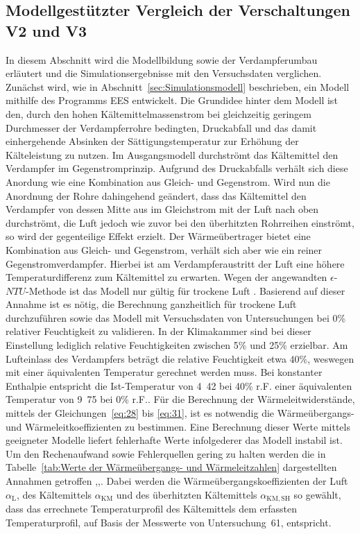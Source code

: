\clearpage

\subsection{Modellgestützter Vergleich der Verschaltungen V2 und V3}
\label{subsec:Modellgestützter Vergleich der Verschaltungen V2 und V3}

In diesem Abschnitt wird die Modellbildung sowie der Verdampferumbau erläutert und die Simulationsergebnisse mit den Versuchsdaten verglichen.
Zunächst wird, wie in Abschnitt~\ref{sec:Simulationsmodell} beschrieben, ein Modell mithilfe des Programms EES entwickelt. 
Die Grundidee hinter dem Modell ist den, durch den hohen Kältemittelmassenstrom bei gleichzeitig geringem Durchmesser der Verdampferrohre bedingten, Druckabfall und das damit einhergehende Absinken der Sättigungstemperatur zur Erhöhung der Kälteleistung zu nutzen. Im Ausgangsmodell durchströmt das Kältemittel den Verdampfer im Gegenstromprinzip. Aufgrund des Druckabfalls verhält sich diese Anordung wie eine Kombination aus Gleich- und Gegenstrom. Wird nun die Anordnung der Rohre dahingehend geändert, dass das Kältemittel den Verdampfer von dessen Mitte aus im Gleichstrom mit der Luft nach oben durchströmt, die Luft jedoch wie zuvor bei den überhitzten Rohrreihen einströmt, so wird der gegenteilige Effekt erzielt. Der Wärmeübertrager bietet eine Kombination aus Gleich- und Gegenstrom, verhält sich aber wie ein reiner Gegenstromverdampfer. Hierbei ist am Verdampferaustritt der Luft eine höhere Temperaturdifferenz zum Kältemittel zu erwarten. 
Wegen der angewandten $\epsilon$-$NTU$-Methode ist das Modell nur gültig für trockene Luft \cite{Bergman.2011}. Basierend auf dieser Annahme ist es nötig, die Berechnung ganzheitlich für trockene Luft durchzuführen sowie das Modell mit Versuchsdaten von Untersuchungen bei \unit{0}{\%} relativer Feuchtigkeit zu validieren. In der Klimakammer sind bei dieser Einstellung lediglich relative Feuchtigkeiten zwischen \unit{5}{\%} und \unit{25}{\%} erzielbar. Am Lufteinlass des Verdampfers beträgt die relative Feuchtigkeit etwa \unit{40}{\%}, weswegen mit einer äquivalenten Temperatur gerechnet werden muss. Bei konstanter Enthalpie entspricht die Ist-Temperatur von \unit{4.42}{\celsius} bei \unit{40}{\%} r.F. einer äquivalenten Temperatur von \unit{9.75}{\celsius} bei \unit{0}{\%} r.F.. \newline
Für die Berechnung der Wärmeleitwiderstände, mittels der Gleichungen~\ref{eq:28} bis \ref{eq:31}, ist es notwendig die Wärmeübergangs- und Wärmeleitkoeffizienten zu bestimmen. Eine Berechnung dieser Werte mittels geeigneter Modelle liefert fehlerhafte Werte infolgederer das Modell instabil ist. Um den Rechenaufwand sowie Fehlerquellen gering zu halten werden die in Tabelle~\ref{tab:Werte der Wärmeübergangs- und Wärmeleitzahlen} dargestellten Annahmen getroffen \cite{Bergman.2011},\cite{Recknagel.2005},\cite{DINDeutschesInstitutfurNormunge.V..2017d}. Dabei werden die Wärmeübergangskoeffizienten der Luft $\alpha_\mathrm{L}$, des Kältemittels $\alpha_\mathrm{KM}$ und des überhitzten Kältemittels $\alpha_\mathrm{KM,SH}$ so gewählt, dass das errechnete Temperaturprofil des Kältemittels dem erfassten Temperaturprofil, auf Basis der Messwerte von Untersuchung~61, entspricht. 

